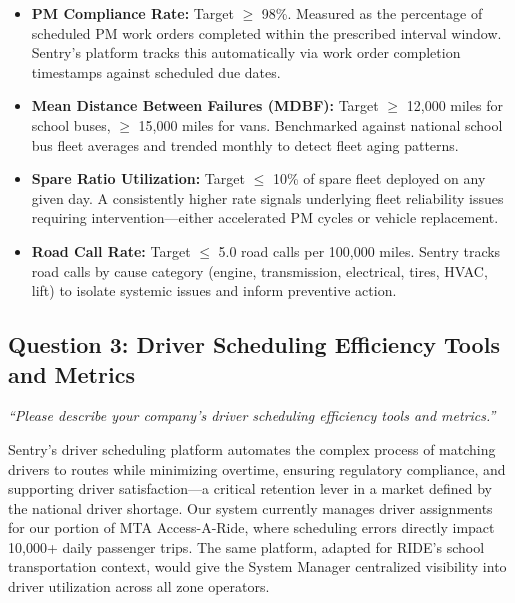 \begin{description}[style=nextline, leftmargin=0.5cm]
    \item[\faIcon{tachometer-alt} \textbf{Key Metrics Tracked:}]
    \begin{itemize}
        \item \textbf{PM Compliance Rate:} Target $\geq$ 98\%. Measured as the percentage of scheduled PM work orders completed within the prescribed interval window. Sentry's platform tracks this automatically via work order completion timestamps against scheduled due dates.
        \item \textbf{Mean Distance Between Failures (MDBF):} Target $\geq$ 12,000 miles for school buses, $\geq$ 15,000 miles for vans. Benchmarked against national school bus fleet averages and trended monthly to detect fleet aging patterns.
        \item \textbf{Spare Ratio Utilization:} Target $\leq$ 10\% of spare fleet deployed on any given day. A consistently higher rate signals underlying fleet reliability issues requiring intervention---either accelerated PM cycles or vehicle replacement.
        \item \textbf{Road Call Rate:} Target $\leq$ 5.0 road calls per 100,000 miles. Sentry tracks road calls by cause category (engine, transmission, electrical, tires, HVAC, lift) to isolate systemic issues and inform preventive action.
    \end{itemize}
\end{description}

\subsection{Question 3: Driver Scheduling Efficiency Tools and Metrics}
\textit{``Please describe your company's driver scheduling efficiency tools and metrics.''}

\vspace{0.3cm}

Sentry's driver scheduling platform automates the complex process of matching drivers to routes while minimizing overtime, ensuring regulatory compliance, and supporting driver satisfaction---a critical retention lever in a market defined by the national driver shortage. Our system currently manages driver assignments for our portion of MTA Access-A-Ride, where scheduling errors directly impact 10,000+ daily passenger trips. The same platform, adapted for RIDE's school transportation context, would give the System Manager centralized visibility into driver utilization across all zone operators.

